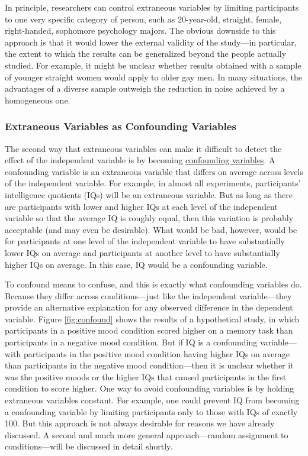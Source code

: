 \documentclass[
]{krantz}
\begin{document}
In principle, researchers can control extraneous variables by limiting participants to one very specific category of person, such as 20-year-old, straight, female, right-handed, sophomore psychology majors. The obvious downside to this approach is that it would lower the external validity of the study---in particular, the extent to which the results can be generalized beyond the people actually studied. For example, it might be unclear whether results obtained with a sample of younger straight women would apply to older gay men. In many situations, the advantages of a diverse sample outweigh the reduction in noise achieved by a homogeneous one.

\subsubsection*{Extraneous Variables as Confounding Variables}\label{extraneous-variables-as-confounding-variables}


The second way that extraneous variables can make it difficult to detect the effect of the independent variable is by becoming \hyperref[confounding-variable]{confounding variables}. A confounding variable is an extraneous variable that differs on average across levels of the independent variable. For example, in almost all experiments, participants' intelligence quotients (IQs) will be an extraneous variable. But as long as there are participants with lower and higher IQs at each level of the independent variable so that the average IQ is roughly equal, then this variation is probably acceptable (and may even be desirable). What would be bad, however, would be for participants at one level of the independent variable to have substantially lower IQs on average and participants at another level to have substantially higher IQs on average. In this case, IQ would be a confounding variable.

To confound means to confuse, and this is exactly what confounding variables do. Because they differ across conditions---just like the independent variable---they provide an alternative explanation for any observed difference in the dependent variable. Figure \ref{fig:confound} shows the results of a hypothetical study, in which participants in a positive mood condition scored higher on a memory task than participants in a negative mood condition. But if IQ is a confounding variable---with participants in the positive mood condition having higher IQs on average than participants in the negative mood condition---then it is unclear whether it was the positive moods or the higher IQs that caused participants in the first condition to score higher. One way to avoid confounding variables is by holding extraneous variables constant. For example, one could prevent IQ from becoming a confounding variable by limiting participants only to those with IQs of exactly 100. But this approach is not always desirable for reasons we have already discussed. A second and much more general approach---random assignment to conditions---will be discussed in detail shortly.
\end{document}
